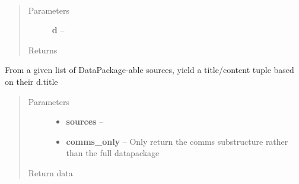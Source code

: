 \documentclass[letterpaper,10pt,english]{sphinxmanual}
\begin{document}

\begin{fulllineitems}
\label{index:bounos.detect_and_identify}~\begin{quote}\begin{description}
\item[{Parameters}] \leavevmode
\textbf{d} -- 

\item[{Returns}] \leavevmode


\end{description}\end{quote}

\end{fulllineitems}


\begin{fulllineitems}
\label{index:bounos.generate_sources}
From a given list of DataPackage-able sources, yield a title/content tuple based on their d.title
\begin{quote}\begin{description}
\item[{Parameters}] \leavevmode\begin{itemize}
\item {} 
\textbf{sources} -- 

\item {} 
\textbf{comms\_only} -- Only return the comms substructure rather than the full datapackage

\end{itemize}

\item[{Return data}] \leavevmode
\end{description}\end{quote}

\end{fulllineitems}

\end{document}

